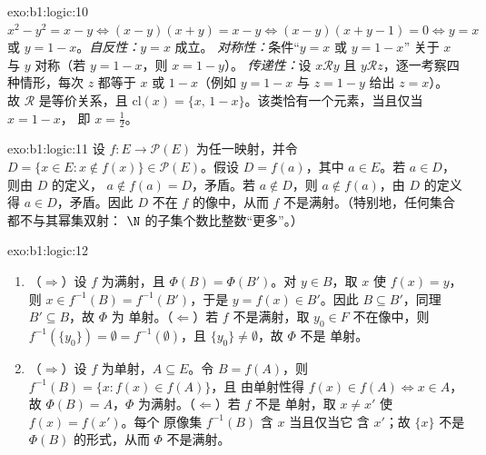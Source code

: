 \begin{solution}{exo:b1:logic:10}
$x^2 - y^2 = x - y \iff (x - y)(x + y) = x - y \iff (x - y)(x + y - 1)
= 0 \iff y = x$ 或 $y = 1 - x$。\emph{自反性：}$y = x$ 成立。
\emph{对称性：}条件“$y = x$ 或 $y = 1 - x$”
        关于 $x$ 与 $y$ 对称（若 $y = 1 - x$，则 $x = 1 - y$）。
\emph{传递性：}设 $x \mathbin{\mathcal{R}} y$ 且 $y
\mathbin{\mathcal{R}} z$，逐一考察四种情形，每次 $z$ 都等于 $x$
或 $1 - x$（例如 $y = 1 - x$ 与 $z = 1 - y$ 给出 $z = x$）。
故 $\mathcal{R}$ 是等价关系，且 $\mathrm{cl}(x) =
\{x,\, 1 - x\}$。该类恰有一个元素，当且仅当 $x = 1 - x$，
即 $x = \frac12$。
\end{solution}

\begin{solution}{exo:b1:logic:11}
设 $f \colon E \to \mathcal{P}(E)$ 为任一映射，并令
$D = \{x \in E : x \notin f(x)\} \in \mathcal{P}(E)$。假设 $D =
f(a)$，其中 $a \in E$。若 $a \in D$，则由 $D$ 的定义，
$a \notin f(a) = D$，矛盾。若 $a \notin D$，则 $a \notin
f(a)$，由 $D$ 的定义得 $a \in D$，矛盾。因此 $D$
不在 $f$ 的像中，从而 $f$ 不是满射。（特别地，任何集合
都不与其幂集双射：
$\N$ 的子集个数比整数“更多”。）
\end{solution}

\begin{solution}{exo:b1:logic:12}
\begin{enumerate}
  \item （$\Rightarrow$）设 $f$ 为满射，且 $\Phi(B) =
        \Phi(B')$。对 $y \in B$，取 $x$ 使 $f(x) = y$，则 $x
        \in f^{-1}(B) = f^{-1}(B')$，于是 $y = f(x) \in B'$。因此 $B
        \subseteq B'$，同理 $B' \subseteq B$，故 $\Phi$ 为
        单射。（$\Leftarrow$）若 $f$ 不是满射，取 $y_0
        \in F$ 不在像中，则 $f^{-1}(\{y_0\}) = \emptyset =
        f^{-1}(\emptyset)$，且 $\{y_0\} \neq \emptyset$，故 $\Phi$ 不是
        单射。
  \item （$\Rightarrow$）设 $f$ 为单射，$A \subseteq E$。令
        $B = f(A)$，则 $f^{-1}(B) = \{x : f(x) \in f(A)\}$，且
        由单射性得 $f(x) \in f(A) \iff x \in A$，故 $\Phi(B) =
        A$，$\Phi$ 为满射。（$\Leftarrow$）若 $f$ 不是
        单射，取 $x \neq x'$ 使 $f(x) = f(x')$。每个
        原像集 $f^{-1}(B)$ 含 $x$ 当且仅当它
        含 $x'$；故 $\{x\}$ 不是 $\Phi(B)$ 的形式，从而
        $\Phi$ 不是满射。
\end{enumerate}
\end{solution}

